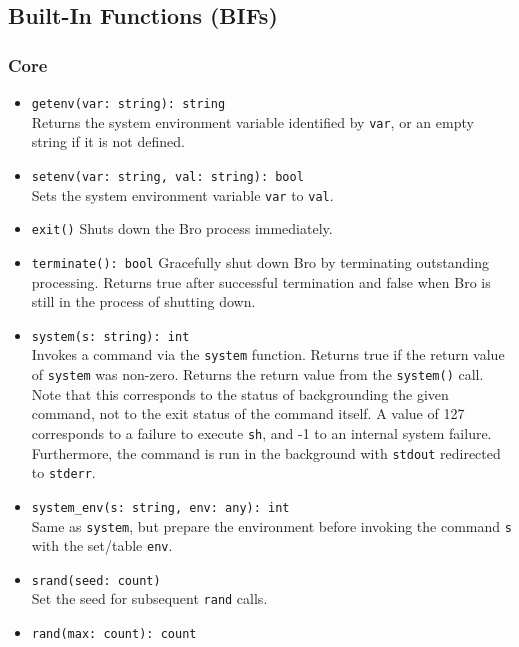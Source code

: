 \documentclass[10pt,landscape]{article}
\begin{document}
\begin{multicols*}{2}
\subsection*{Built-In Functions (BIFs)}
\linespread{0.9}

\subsubsection*{Core}

\begin{itemize}
  \item \verb|getenv(var: string): string|\\
    Returns the system environment variable identified by \texttt{var}, or an
    empty string if it is not defined.
  \item \verb|setenv(var: string, val: string): bool|\\
    Sets the system environment variable \texttt{var} to \texttt{val}.
  \item \verb|exit()|
    Shuts down the Bro process immediately.
  \item \verb|terminate(): bool|
    Gracefully shut down Bro by terminating outstanding processing. Returns
    true after successful termination and false when Bro is still in the
    process of shutting down.
  \item \verb|system(s: string): int|\\
    Invokes a command via the \texttt{system} function.
    Returns true if the return value of \texttt{system} was non-zero.
    Returns the return value from the \texttt{system()} call. Note that this
    corresponds to the status of backgrounding the given command, not to the
    exit status of the command itself. A value of 127 corresponds to a failure
    to execute \verb|sh|, and -1 to an internal system failure. Furthermore,
    the command is run in the background with \verb|stdout| redirected to
    \verb|stderr|.
  \item \verb|system_env(s: string, env: any): int|\\
    Same as \verb|system|, but prepare the environment before invoking the
    command \texttt{s} with the set/table \texttt{env}.
  \item \verb|srand(seed: count)|\\
    Set the seed for subsequent \verb|rand| calls.
  \item \verb|rand(max: count): count|\\

\end{itemize}
\end{multicols*}
\end{document}
